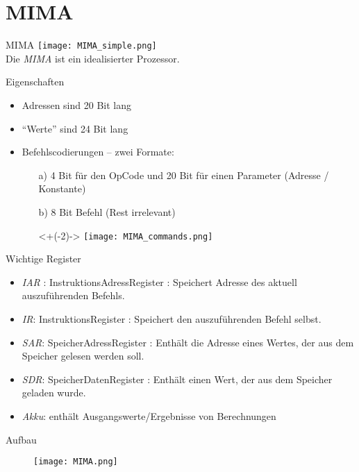 \section{MIMA}

\begin{frame}{MIMA}
    \centering
	\texttt{[image: MIMA\_simple.png]}\\
	Die \emph{MIMA} ist ein idealisierter Prozessor. 
\end{frame}

\begin{frame}{Eigenschaften}
	\begin{itemize}[<+->]
		\item Adressen sind 20 Bit lang
		\item \enquote{Werte} sind 24 Bit lang
		\item Befehlscodierungen -- zwei Formate:
		\begin{itemize}
			\item[a)] 4 Bit für den OpCode und 20 Bit für einen Parameter (Adresse / Konstante)
			\item[b)] 8 Bit Befehl (Rest irrelevant)\\
			\item[]<+(-2)-> \texttt{[image: MIMA\_commands.png]} 
		\end{itemize} 
	\end{itemize}
\end{frame}


\begin{frame}{Wichtige Register}
	\begin{itemize}[<+->]
		\item \emph{IAR} : InstruktionsAdressRegister : Speichert Adresse des aktuell auszuführenden Befehls.
		\item \emph{IR}: InstruktionsRegister : Speichert den auszuführenden Befehl selbst.
		\item \emph{SAR}: SpeicherAdressRegister : Enthält die Adresse eines Wertes, der aus dem Speicher gelesen werden soll.
		\item \emph{SDR}: SpeicherDatenRegister : Enthält einen Wert, der aus dem Speicher geladen wurde.
		\item \emph{Akku}: enthält Ausgangswerte/Ergebnisse von Berechnungen
	\end{itemize}
\end{frame}

\begin{frame}[t]{Aufbau}
	\begin{figure}
		\centering
		\texttt{[image: MIMA.png]}
	\end{figure}
\end{frame}

